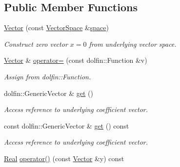 \subsection*{Public Member Functions}
\begin{DoxyCompactItemize}
\item 
\hyperlink{classSpacy_1_1FEniCS_1_1Vector_ad73e826490b7b7be5588e9c0c9318cb5}{Vector} (const \hyperlink{classSpacy_1_1VectorSpace}{Vector\+Space} \&\hyperlink{classSpacy_1_1VectorBase_aa999dbf9d679d895dfe04c10fbf9f5e9}{space})\hypertarget{classSpacy_1_1FEniCS_1_1Vector_ad73e826490b7b7be5588e9c0c9318cb5}{}\label{classSpacy_1_1FEniCS_1_1Vector_ad73e826490b7b7be5588e9c0c9318cb5}

\begin{DoxyCompactList}\small\item\em Construct zero vector $x=0$ from underlying vector space. \end{DoxyCompactList}\item 
\hyperlink{classSpacy_1_1FEniCS_1_1Vector}{Vector} \& \hyperlink{classSpacy_1_1FEniCS_1_1Vector_ad4d68b813d9374aa83f37ec2b3ad02fc}{operator=} (const dolfin\+::\+Function \&v)\hypertarget{classSpacy_1_1FEniCS_1_1Vector_ad4d68b813d9374aa83f37ec2b3ad02fc}{}\label{classSpacy_1_1FEniCS_1_1Vector_ad4d68b813d9374aa83f37ec2b3ad02fc}

\begin{DoxyCompactList}\small\item\em Assign from dolfin\+::\+Function. \end{DoxyCompactList}\item 
dolfin\+::\+Generic\+Vector \& \hyperlink{classSpacy_1_1FEniCS_1_1Vector_afadf508451c68fd767da6a1be4852fed}{get} ()\hypertarget{classSpacy_1_1FEniCS_1_1Vector_afadf508451c68fd767da6a1be4852fed}{}\label{classSpacy_1_1FEniCS_1_1Vector_afadf508451c68fd767da6a1be4852fed}

\begin{DoxyCompactList}\small\item\em Access reference to underlying coefficient vector. \end{DoxyCompactList}\item 
const dolfin\+::\+Generic\+Vector \& \hyperlink{classSpacy_1_1FEniCS_1_1Vector_ac69fe18ef6818182186f9db82da0f7e2}{get} () const \hypertarget{classSpacy_1_1FEniCS_1_1Vector_ac69fe18ef6818182186f9db82da0f7e2}{}\label{classSpacy_1_1FEniCS_1_1Vector_ac69fe18ef6818182186f9db82da0f7e2}

\begin{DoxyCompactList}\small\item\em Access reference to underlying coefficient vector. \end{DoxyCompactList}\item 
\hyperlink{classSpacy_1_1Real}{Real} \hyperlink{classSpacy_1_1FEniCS_1_1Vector_a99a75031c47961b9ef1161197c4d3f8e}{operator()} (const \hyperlink{classSpacy_1_1FEniCS_1_1Vector}{Vector} \&y) const \hypertarget{classSpacy_1_1FEniCS_1_1Vector_a99a75031c47961b9ef1161197c4d3f8e}{}\label{classSpacy_1_1FEniCS_1_1Vector_a99a75031c47961b9ef1161197c4d3f8e}


\end{DoxyCompactItemize}
